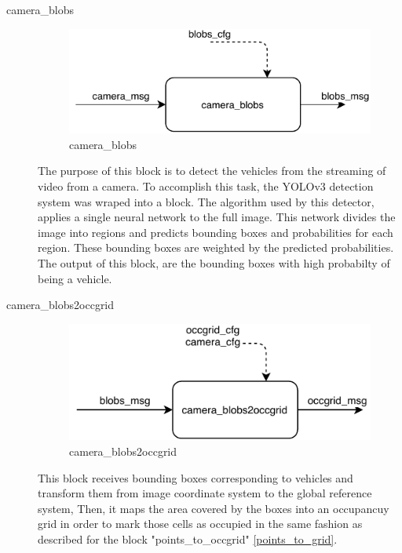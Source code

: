 \begin{description}
\item[camera\_blobs] \hfill

\begin{figure}[ht!]
\centering
\includegraphics[scale=1]{fig/3/camera_blobs.pdf}
\caption{camera\_blobs}
\label{camera_blobs}
\end{figure}

The purpose of this block is to detect the vehicles from the streaming of video from a camera. To accomplish this task, the YOLOv3 detection system \cite{yolov3} was wraped into a block. The algorithm used by this detector, applies a single neural network to the full image. This network divides the image into regions and predicts bounding boxes and probabilities for each region. These bounding boxes are weighted by the predicted probabilities. The output of this block, are the bounding boxes with high probabilty of being a vehicle.


\item[camera\_blobs2occgrid] \hfill

\begin{figure}[ht!]
\centering
\includegraphics[scale=1]{fig/3/camera_blobs2occgrid.pdf}
\caption{camera\_blobs2occgrid}
\label{camera_blobs2occgrid}
\end{figure}

This block receives bounding boxes corresponding to vehicles and transform them from image coordinate system to the global reference system, Then, it maps the area covered by the boxes into an occupancuy grid in order to mark those cells as occupied in the same fashion as described for the block "points\_to\_occgrid" \ref{points_to_grid}.

\end{description}

